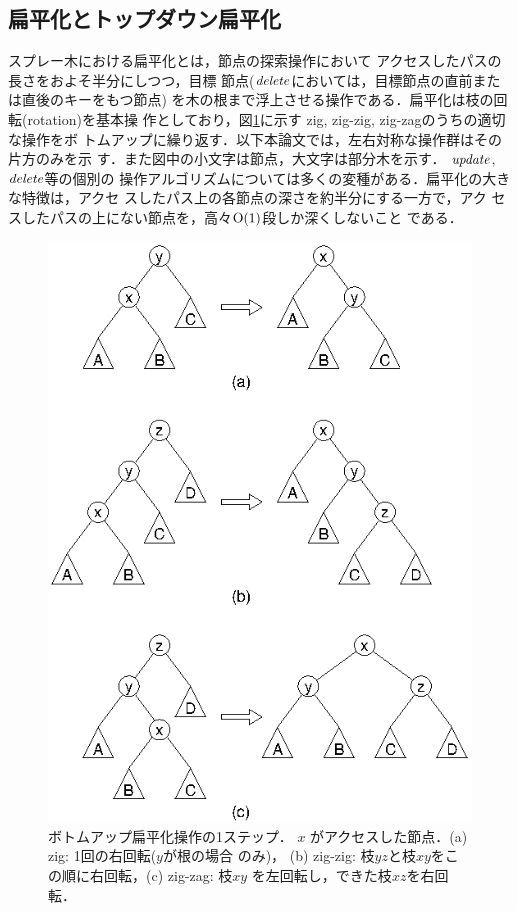 \documentclass[T]{compsoft}
\begin{document}
\subsection{扁平化とトップダウン扁平化}\label{subsection:splaying}

スプレー木における扁平化とは，節点の探索操作において
アクセスしたパスの長さをおよそ半分にしつつ，目標
節点(${\it delete\/}$においては，目標節点の直前または直後のキーをもつ節点)
を木の根まで浮上させる操作である．扁平化は枝の回転(rotation)を基本操
作としており，図\ref{figure:splaying}に示す
zig, zig-zig, zig-zagのうちの適切な操作をボ
トムアップに繰り返す．以下本論文では，左右対称な操作群はその片方のみを示
す．また図中の小文字は節点，大文字は部分木を示す．
%
${\it update}$, ${\it delete\/}$等の個別の
操作アルゴリズムについては多くの変種がある．扁平化の大きな特徴は，アクセ
スしたパス上の各節点の深さを約半分にする一方で，アク
セスしたパスの上にない節点を，高々${\rm O}(1)$段しか深くしないこと
である．

\begin{figure}[tb]
  \centerline {\includegraphics{images/fig1.eps}}
\caption{
ボトムアップ扁平化操作の1ステップ． %
$x$ がアクセスした節点．(a) zig: 1回の右回転($y$が根の場合
のみ)，
(b) zig-zig: 枝$yz$と枝$xy$をこの順に右回転，(c) zig-zag: 枝$xy$
を左回転し，できた枝$xz$を右回転．}
\label{figure:splaying}
\end{figure}
\end{document}
